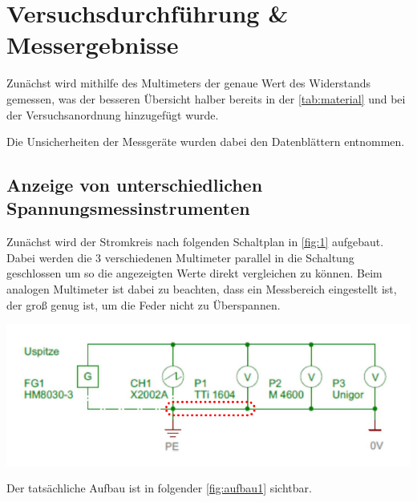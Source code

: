 \documentclass[11pt,ngerman]{scrartcl}
\begin{document}
\newpage

\section{Versuchsdurchführung \& Messergebnisse}\label{sec:Versuchsdurchführung}

Zunächst wird mithilfe des Multimeters der genaue Wert des Widerstands gemessen, was der besseren Übersicht halber bereits in der \autoref{tab:material} und bei der Versuchsanordnung hinzugefügt wurde.

Die Unsicherheiten der Messgeräte wurden dabei den Datenblättern entnommen.

\subsection{Anzeige von unterschiedlichen Spannungsmessinstrumenten}

Zunächst wird der Stromkreis nach folgenden Schaltplan in \autoref{fig:1} aufgebaut. Dabei werden die 3 verschiedenen Multimeter parallel in die Schaltung geschlossen um so die angezeigten Werte direkt vergleichen zu können. Beim analogen Multimeter ist dabei zu beachten, dass ein Messbereich eingestellt ist, der groß genug ist, um die Feder nicht zu Überspannen.

\begin{center}
	\begin{minipage}[t]{0.8\textwidth}
		\includegraphics[width=\textwidth]{skizze_1}
		\label{fig:1}
	\end{minipage}
\end{center}

\noindent Der tatsächliche Aufbau ist in folgender \autoref{fig:aufbau1} sichtbar.
\end{document}
